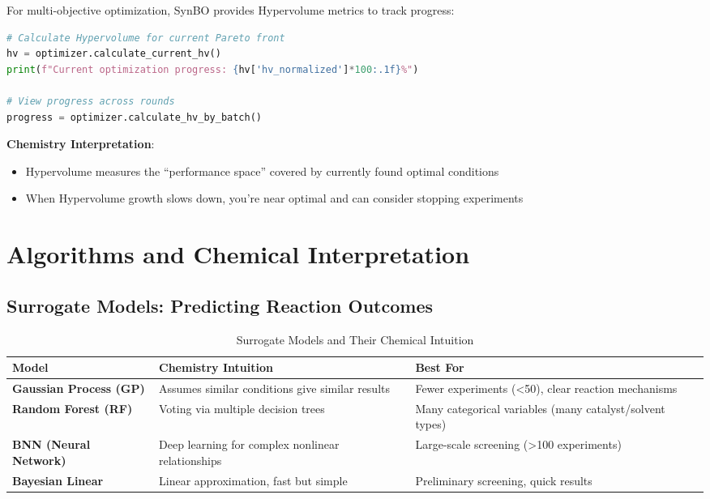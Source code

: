 \documentclass[12pt,a4paper]{article}
\begin{document}
For multi-objective optimization, SynBO provides Hypervolume metrics to track progress:

\begin{lstlisting}[language=python]
# Calculate Hypervolume for current Pareto front
hv = optimizer.calculate_current_hv()
print(f"Current optimization progress: {hv['hv_normalized']*100:.1f}%")

# View progress across rounds
progress = optimizer.calculate_hv_by_batch()
\end{lstlisting}

\textbf{Chemistry Interpretation}:
\begin{itemize}
    \item Hypervolume measures the ``performance space'' covered by currently found optimal conditions
    \item When Hypervolume growth slows down, you're near optimal and can consider stopping experiments
\end{itemize}

\section{Algorithms and Chemical Interpretation}
\label{sec:algorithms}

\subsection{Surrogate Models: Predicting Reaction Outcomes}

\begin{table}[h]
\centering
\caption{Surrogate Models and Their Chemical Intuition}
\begin{tabular}{p{3.5cm}p{5cm}p{4cm}}
\toprule
\textbf{Model} & \textbf{Chemistry Intuition} & \textbf{Best For} \\
\midrule
\textbf{Gaussian Process (GP)} & Assumes similar conditions give similar results & Fewer experiments (<50), clear reaction mechanisms \\
\textbf{Random Forest (RF)} & Voting via multiple decision trees & Many categorical variables (many catalyst/solvent types) \\
\textbf{BNN (Neural Network)} & Deep learning for complex nonlinear relationships & Large-scale screening (>100 experiments) \\
\textbf{Bayesian Linear} & Linear approximation, fast but simple & Preliminary screening, quick results \\
\bottomrule
\end{tabular}
\end{table}
\end{document}
